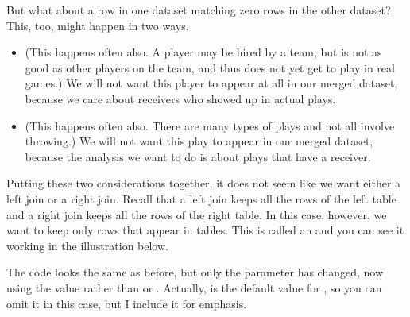 \documentclass[letterpaper,10pt,english]{sphinxmanual}
\begin{document}
But what about a row in one dataset matching zero rows in the other dataset?  This, too, might happen in two ways.
\begin{itemize}
\item {} 
  (This happens often also.  A player may be hired by a team, but is not as good as other players on the team, and thus does not yet get to play in real games.)  We will not want this player to appear at all in our merged dataset, because we care about receivers who showed up in actual plays.

\item {} 
  (This happens often also.  There are many types of plays and not all involve throwing.)  We will not want this play to appear in our merged dataset, because the analysis we want to do is about plays that have a receiver.

\end{itemize}

Putting these two considerations together, it does not seem like we want either a left join or a right join.  Recall that a left join keeps all the rows of the left table and a right join keeps all the rows of the right table.  In this case, however, we want to keep only rows that appear in  tables.  This is called an  and you can see it working in the illustration below.


The code looks the same as before, but only the  parameter has changed, now using the value  rather than  or .  Actually,  is the default value for , so you can omit it in this case, but I include it for emphasis.

\begin{sphinxVerbatim}[commandchars=\\\{\}]
    
       
\end{sphinxVerbatim}
\end{document}

